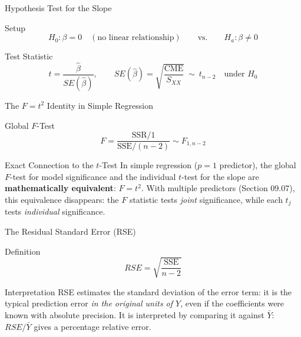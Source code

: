 \documentclass[10pt, aspectratio=169]{beamer}
\begin{document}
\begin{frame}{Hypothesis Test for the Slope}
  \footnotesize
  \begin{block}{Setup}
    $$H_0:\beta=0 \quad (\text{no linear relationship}) \qquad \text{vs.} \qquad H_a:\beta\neq0$$
  \end{block}
  \pause

  \vspace{0.1cm}
  \begin{alertblock}{Test Statistic}
    $$t=\frac{\hat\beta}{SE(\hat\beta)}, \qquad SE(\hat\beta)=\sqrt{\frac{\text{CME}}{S_{XX}}} \ \sim\ t_{n-2} \quad\text{under } H_0$$
  \end{alertblock}
\end{frame}

\begin{frame}{The $F=t^2$ Identity in Simple Regression}
  \footnotesize
  \begin{block}{Global $F$-Test}
    $$F=\frac{\text{SSR}/1}{\text{SSE}/(n-2)} \sim F_{1,n-2}$$
  \end{block}
  \pause

  \vspace{0.1cm}
  \begin{alertblock}{Exact Connection to the $t$-Test}
    In simple regression ($p=1$ predictor), the global $F$-test for model significance and the individual $t$-test for the slope are \textbf{mathematically equivalent}: $F=t^2$. With multiple predictors (Section 09.07), this equivalence disappears: the $F$ statistic tests \emph{joint} significance, while each $t_j$ tests \emph{individual} significance.
  \end{alertblock}
\end{frame}

\begin{frame}{The Residual Standard Error (RSE)}
  \footnotesize
  \begin{block}{Definition}
    $$RSE=\sqrt{\frac{\text{SSE}}{n-2}}$$
  \end{block}
  \pause

  \vspace{0.1cm}
  \begin{alertblock}{Interpretation}
    RSE estimates the standard deviation of the error term: it is the typical prediction error \emph{in the original units of $Y$}, even if the coefficients were known with absolute precision. It is interpreted by comparing it against $\bar Y$: $RSE/\bar Y$ gives a percentage relative error.
  \end{alertblock}
\end{frame}
\end{document}
